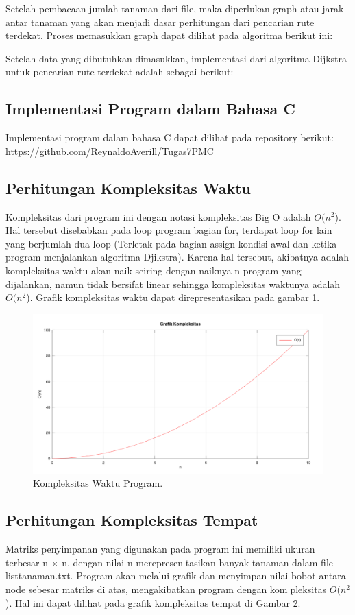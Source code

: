 \documentclass[conference]{IEEEtran}
\begin{document}
Setelah pembacaan jumlah tanaman dari file, maka diperlukan graph atau jarak antar tanaman yang akan menjadi dasar perhitungan dari pencarian rute terdekat. Proses memasukkan graph dapat dilihat pada algoritma berikut ini:

Setelah data yang dibutuhkan dimasukkan, implementasi dari algoritma Dijkstra untuk pencarian rute terdekat adalah sebagai berikut:

\subsection{Implementasi Program dalam Bahasa C}
Implementasi program dalam bahasa C dapat dilihat pada repository berikut:  \url{https://github.com/ReynaldoAverill/Tugas7PMC}

\subsection{Perhitungan Kompleksitas Waktu}
Kompleksitas dari program ini dengan notasi kompleksitas Big O adalah $ O(n^{2} $). Hal tersebut disebabkan pada loop program bagian for, terdapat loop for lain yang berjumlah dua loop (Terletak pada bagian assign kondisi awal dan ketika program menjalankan algoritma Djikstra). Karena hal tersebut, akibatnya adalah kompleksitas waktu akan naik seiring dengan naiknya n program yang dijalankan, namun tidak bersifat linear sehingga kompleksitas waktunya adalah $ O(n^{2} $). Grafik kompleksitas waktu dapat direpresentasikan pada gambar 1.


\begin{figure}[htbp]
\centerline{\includegraphics{fig1.png}}
\caption{Kompleksitas Waktu Program.}
\label{fig}
\end{figure}

\subsection{Perhitungan Kompleksitas Tempat}
Matriks penyimpanan yang digunakan pada program ini memiliki ukuran terbesar n × n, dengan nilai n merepresentasikan banyak tanaman dalam file listtanaman.txt. Program akan melalui grafik dan menyimpan nilai bobot antara node sebesar matriks di atas, mengakibatkan program dengan kompleksitas $ O(n^{2} $). Hal ini dapat dilihat pada grafik kompleksitas tempat di Gambar 2.
\end{document}
